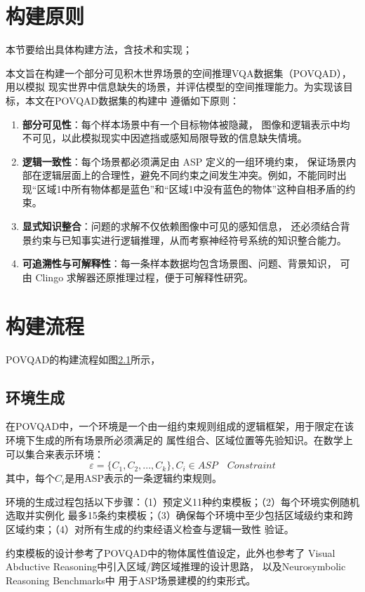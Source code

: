 \section{构建原则}
本节要给出具体构建方法，含技术和实现；

本文旨在构建一个部分可见积木世界场景的空间推理VQA数据集（POVQAD），用以模拟
现实世界中信息缺失的场景，并评估模型的空间推理能力。为实现该目标，本文在POVQAD数据集的构建中
遵循如下原则：
\begin{enumerate}[itemsep=0pt,parsep=0pt]
\item \textbf{部分可见性}：每个样本场景中有一个目标物体被隐藏，
图像和逻辑表示中均不可见，以此模拟现实中因遮挡或感知局限导致的信息缺失情境。
\item \textbf{逻辑一致性}：每个场景都必须满足由 ASP 定义的一组环境约束，
保证场景内部在逻辑层面上的合理性，避免不同约束之间发生冲突。例如，不能同时出现“区域1中所有物体都是蓝色”和“区域1中没有蓝色的物体”这种自相矛盾的约束。
\item \textbf{显式知识整合}：问题的求解不仅依赖图像中可见的感知信息，
还必须结合背景约束与已知事实进行逻辑推理，从而考察神经符号系统的知识整合能力。
\item \textbf{可追溯性与可解释性}：每一条样本数据均包含场景图、问题、背景知识，
可由 Clingo 求解器还原推理过程，便于可解释性研究。
\end{enumerate}
\section{构建流程}
POVQAD的构建流程如图\ref{}所示，

\subsection{环境生成}
在POVQAD中，一个环境是一个由一组约束规则组成的逻辑框架，用于限定在该环境下生成的所有场景所必须满足的
属性组合、区域位置等先验知识。在数学上可以集合来表示环境：
$$\varepsilon = \{ C_1, C_2, ..., C_k \}, C_i \in ASP \quad Constraint$$
其中，每个$C_i$是用ASP表示的一条逻辑约束规则。

环境的生成过程包括以下步骤：（1）预定义11种约束模板；（2）每个环境实例随机选取并实例化
最多15条约束模板；（3）确保每个环境中至少包括区域级约束和跨区域约束；（4）对所有生成的约束经语义检查与逻辑一致性
验证。

约束模板的设计参考了POVQAD中的物体属性值设定，此外也参考了
Visual Abductive Reasoning\cite{liang2022visualabductivereasoning}中引入区域/跨区域推理的设计思路，
以及Neurosymbolic Reasoning Benchmarks\cite{bortolotti2024neurosymbolicbenchmarksuiteconcept}中
用于ASP场景建模的约束形式。

